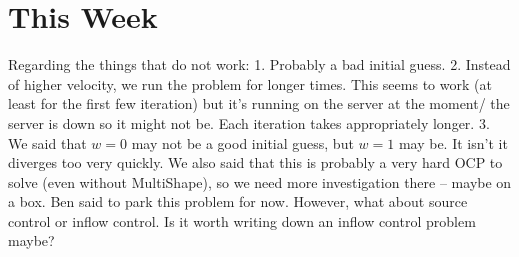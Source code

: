 \documentclass[11pt, a4paper]{article}
\theoremstyle{definition}
\begin{document}
    \section{This Week}
    Regarding the things that do not work:
    1. Probably a bad initial guess.
    2. Instead of higher velocity, we run the problem for longer times. This seems to work (at least for the first few iteration) but it's running on the server at the moment/ the server is down so it might not be. Each iteration takes appropriately longer.
    3. We said that $w=0$ may not be a good initial guess, but $w = 1$ may be. It isn't it diverges too very quickly. We also said that this is probably a very hard OCP to solve (even without MultiShape), so we need more investigation there -- maybe on a box. Ben said to park this problem for now.
    However, what about source control or inflow control. Is it worth writing down an inflow control problem maybe?
    
\end{document}
